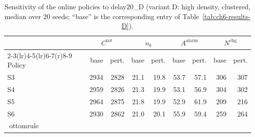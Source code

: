 \begin{table}[htbp]
\centering
\caption{Sensitivity of the online policies to delay20_D (variant D: high density, clustered,
median over 20 seeds; ``base'' is the corresponding entry of
Table~\ref{tab:ch6-results-D}).}
\label{tab:ch6-sens-D-delay20}
\footnotesize
\begin{tabular}{@{}l rr rr rr rr@{}}
\toprule
& \multicolumn{2}{c}{$C^{\mathrm{tot}}$} & \multicolumn{2}{c}{$n_b$}
  & \multicolumn{2}{c}{$A^{\mathrm{alarm}}$} & \multicolumn{2}{c}{$N^{\mathrm{chg}}$} \\
\cmidrule(r){2-3}\cmidrule(lr){4-5}\cmidrule(lr){6-7}\cmidrule(r){8-9}
Policy & base & pert. & base & pert. & base & pert. & base & pert. \\
\midrule

S3 & 2934 & 2828 & 21.1 & 19.8 & 53.7 & 57.1 & 306 & 307 \\
S4 & 2959 & 2826 & 21.3 & 19.9 & 53.1 & 56.9 & 304 & 302 \\
S5 & 2964 & 2875 & 21.8 & 19.9 & 52.9 & 61.9 & 209 & 216 \\
S6 & 2930 & 2862 & 21.0 & 20.1 & 55.9 & 59.4 & 259 & 264 \\
ottomrule
\end{tabular}
\end{table}
